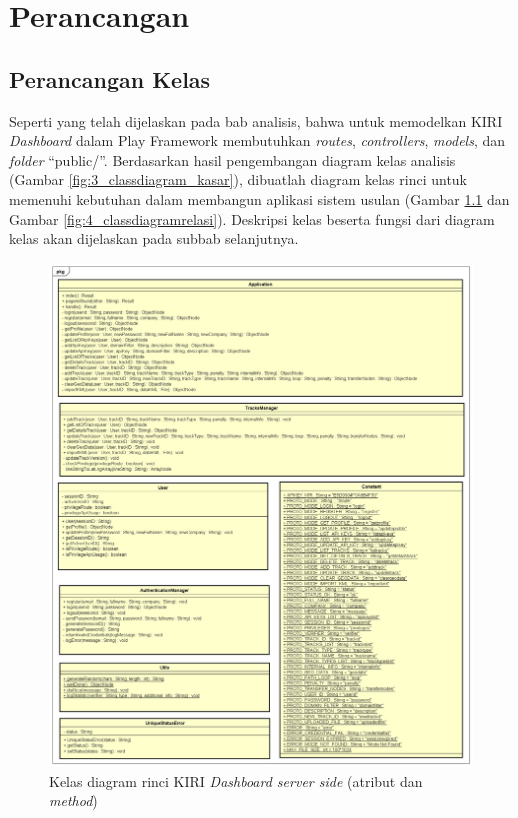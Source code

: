 \chapter{Perancangan}
\label{chap:perancangan}

\section{Perancangan Kelas}
\label{sec:diagramkelas}
Seperti yang telah dijelaskan pada bab analisis, bahwa untuk memodelkan KIRI \textit{Dashboard} dalam Play Framework membutuhkan \textit{routes}, \textit{controllers}, \textit{models}, dan \textit{folder} ``public/''. Berdasarkan hasil pengembangan diagram kelas analisis (Gambar \ref{fig:3_classdiagram_kasar}), dibuatlah diagram kelas rinci untuk memenuhi kebutuhan dalam membangun aplikasi sistem usulan (Gambar \ref{fig:4_classdiagramatribut} dan Gambar \ref{fig:4_classdiagramrelasi}). Deskripsi kelas beserta fungsi dari diagram kelas akan dijelaskan pada subbab selanjutnya.

\begin{figure}[htbp]
	\centering
		\includegraphics[scale=0.45]{Gambar/4_classdiagram_atribut.png}
	\caption{Kelas diagram rinci KIRI \textit{Dashboard server side} (atribut dan \textit{method})}
	\label{fig:4_classdiagramatribut}
\end{figure}

